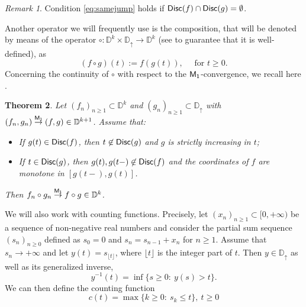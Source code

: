 \documentclass[]{amsart}
\numberwithin{equation}{section}
\newtheorem{thm}{Theorem}[section]
\theoremstyle{remark}
\newtheorem{rmk}[thm]{Remark}
\theoremstyle{definition}
\begin{document}
\begin{rmk}
	Condition \eqref{eq:samejump} holds if ${\sf Disc}(f)\cap {\sf Disc}(g)=\emptyset$.
\end{rmk}
Another operator we will frequently use is the composition, that will be denoted by means of the operator $\circ:\mathbb{D}^k \times \mathbb{D}_{\uparrow} \to \mathbb{D}^k$ (see \cite[Lemma 13.2.4]{whitt2002stochastic} to guarantee that it is well-defined), as
\begin{equation*}
	(f\circ g)(t):=f(g(t)), \quad \mbox{ for } t \ge 0.
\end{equation*}
Concerning the continuity of $\circ$ with respect to the ${\sf M_1}$-convergence, we recall here \cite[Theorem 13.2.4]{whitt2002stochastic}.
\begin{thm}\label{thm:contcomp}
	Let $(f_n)_{n \ge 1}\subset \mathbb{D}^k$ and $(g_n)_{n \ge 1}\subset \mathbb{D}_{\uparrow}$ with $(f_n,g_n) \overset{\sf M_1}{\to} (f,g) \in \mathbb{D}^{k+1}$. Assume that:
	\begin{itemize}
		\item[$(i)$] If $g(t) \in {\sf Disc}(f)$, then $t \not \in {\sf Disc}(g)$ and $g$ is strictly increasing in $t$;
		\item[$(ii)$] If $t \in {\sf Disc}(g)$, then $g(t),g(t-)\not \in {\sf Disc}(f)$ and the coordinates of $f$ are monotone in $[g(t-),g(t)]$. 
	\end{itemize}
	Then $f_n \circ g_n \overset{\sf M_1}{\to}f \circ g \in \mathbb{D}^k$.
\end{thm}
We will also work with counting functions. Precisely, let $(x_n)_{n \ge 1}\subset [0,+\infty)$ be a sequence of non-negative real numbers and consider the partial sum sequence $(s_n)_{n \ge 0}$ defined as $s_0=0$ and $s_n=s_{n-1}+x_n$ for $n \ge 1$.
Assume that $s_n \to +\infty$ and let $y(t)=s_{\lfloor t \rfloor}$, where $\lfloor t \rfloor$ is the integer part of $t$. Then $y \in \mathbb{D}_{\uparrow}$ as well as its generalized inverse,
\begin{equation*}
	y^{-1}(t)=\inf\{s \ge 0: \ y(s)>t\}.
\end{equation*}
We can then define the counting function
\begin{equation*}
	c(t)=\max\{k \ge 0: \ s_k \le t\}, \ t \ge 0
\end{equation*}
\end{document}
